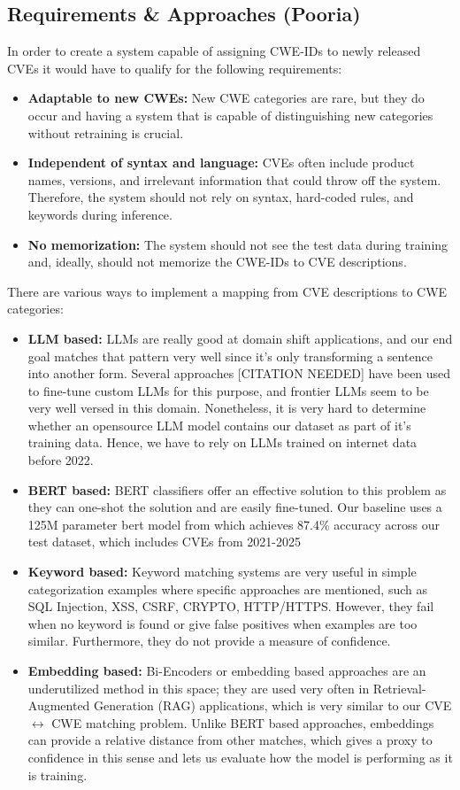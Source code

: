 \documentclass[conference,compsoc]{IEEEtran}
\begin{document}
\subsection{Requirements \& Approaches (Pooria)}
In order to create a system capable of assigning CWE-IDs to newly released CVEs it would have to qualify for the following requirements:
\begin{itemize}
    \item \textbf{Adaptable to new CWEs:} New CWE categories are rare, but they do occur and having a system that is capable of distinguishing new categories without retraining is crucial.
    \item \textbf{Independent of syntax and language:} CVEs often include product names, versions, and irrelevant information that could throw off the system. Therefore, the system should not rely on syntax, hard-coded rules, and keywords during inference.
    \item \textbf{No memorization:} The system should not see the test data during training and, ideally, should not memorize the CWE-IDs to CVE descriptions.
\end{itemize}
There are various ways to implement a mapping from CVE descriptions to CWE categories:
\begin{itemize}
    \item \textbf{LLM based:} LLMs are really good at domain shift applications, and our end goal matches that pattern very well since it's only transforming a sentence into another form. Several approaches [CITATION NEEDED] have been used to fine-tune custom LLMs for this purpose, and frontier LLMs seem to be very well versed in this domain. Nonetheless, it is very hard to determine whether an opensource LLM model contains our dataset as part of it's training data. Hence, we have to rely on LLMs trained on internet data before 2022.
    
    \item \textbf{BERT based:} BERT classifiers offer an effective solution to this problem as they can one-shot the solution and are easily fine-tuned. Our baseline uses a 125M parameter bert model from \cite{mosievskiy2026roberta} which achieves 87.4\% accuracy across our test dataset, which includes CVEs from 2021-2025
    \item \textbf{Keyword based:} Keyword matching systems are very useful in simple categorization examples where specific approaches are mentioned, such as SQL Injection, XSS, CSRF, CRYPTO, HTTP/HTTPS. However, they fail when no keyword is found or give false positives when examples are too similar. Furthermore, they do not provide a measure of confidence.
    \item \textbf{Embedding based:} Bi-Encoders or embedding based approaches are an underutilized method in this space; they are used very often in Retrieval-Augmented Generation (RAG) applications, which is very similar to our CVE $\leftrightarrow$ CWE matching problem. Unlike BERT based approaches, embeddings can provide a relative distance from other matches, which gives a proxy to confidence in this sense and lets us evaluate how the model is performing as it is training.
\end{itemize}
\end{document}
